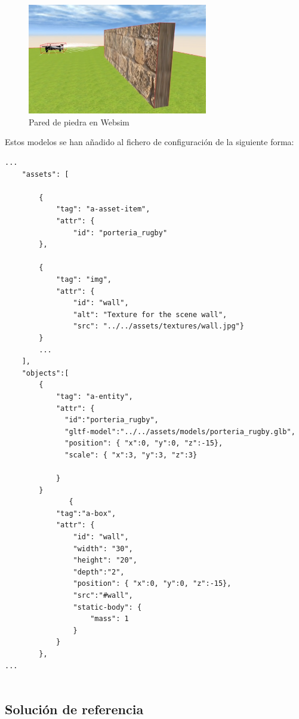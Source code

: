 \begin{figure}[H]
\centering
    \includegraphics[width=0.7\textwidth, height=0.5\textwidth]{chapters/images/pared.png}
    \caption{Pared de piedra en Websim}
    \label{fig:f1}
  \end{figure}

Estos modelos se han añadido al fichero de configuración de la siguiente forma:
\begin{lstlisting}
...
    "assets": [

        {
            "tag": "a-asset-item",
            "attr": {
                "id": "porteria_rugby"
		},
		
		{
            "tag": "img",
            "attr": {
                "id": "wall",
                "alt": "Texture for the scene wall",
                "src": "../../assets/textures/wall.jpg"}
        }
		...
    ],
    "objects":[ 
        {
            "tag": "a-entity",
            "attr": {
              "id":"porteria_rugby",
              "gltf-model":"../../assets/models/porteria_rugby.glb",
              "position": { "x":0, "y":0, "z":-15},
              "scale": { "x":3, "y":3, "z":3}

            }
        }
               {
            "tag":"a-box",
            "attr": {
                "id": "wall",
                "width": "30",
                "height": "20",
                "depth":"2",
                "position": { "x":0, "y":0, "z":-15},
                "src":"#wall",
                "static-body": {
                    "mass": 1
                }
            }
        },
...
  
\end{lstlisting}



\subsection{Solución de referencia}

